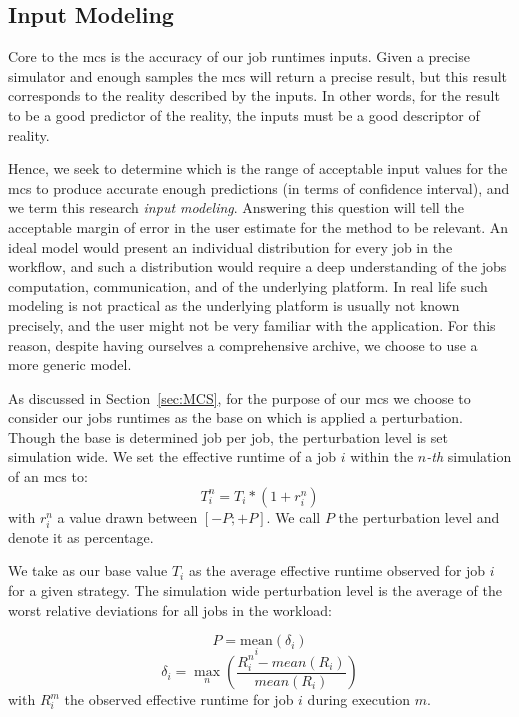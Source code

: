 \documentclass[10pt,conference,compsocconf]{IEEEtran}
\begin{document}
\subsection{Input Modeling}\label{sec:im}

Core  to the  \acl{mcs} is  the accuracy  of our  job runtimes  inputs. Given  a
precise simulator and enough samples the  \ac{mcs} will return a precise result,
but this  result corresponds to  the reality described  by the inputs.  In other
words, for the result to be a good  predictor of the reality, the inputs must be
a good descriptor of reality.

Hence, we seek  to determine which is  the range of acceptable  input values for
the  \ac{mcs} to  produce accurate  enough predictions  (in terms  of confidence
interval),  and we  term this  research \emph{input  modeling}.  Answering  this
question will tell the  acceptable margin of error in the  user estimate for the
method to be relevant.
An ideal  model would present  an individual distribution  for every job  in the
workflow, and such a distribution would require a deep understanding of the jobs
computation, communication, and  of the underlying platform.  In  real life such
modeling  is not  practical  as the  underlying platform  is  usually not  known
precisely, and  the user might  not be very  familiar with the  application. For
this reason, despite having ourselves a  comprehensive archive, we choose to use
a more generic model.

As discussed in Section~\ref{sec:MCS}, for the purpose of our \ac{mcs} we choose
to  consider   our  jobs   runtimes  as   the  base  on   which  is   applied  a
perturbation. Though the base is determined  job per job, the perturbation level
is  set  simulation  wide.  We set the  effective  runtime of  a  job  $i$
within  the $n$\textit{-th} simulation of an \ac{mcs} to:
\[T_i^n = T_i * (1+r_i^n)\]
with $r_i^n$ a value drawn between $[-P;+P]$. We call $P$ the perturbation level
and denote it as percentage. 

We take as  our base value $T_i$  as the average effective  runtime observed for
job $i$ for a given strategy.  The simulation wide  perturbation level is  the
average of  the worst relative deviations for all jobs in the workload:

\[P = \underset{i}{\textrm{mean}}(\delta{}_i)\]
\[\delta{}_i = \max_n\left(\frac{R_i^n-mean(R_i)}{mean(R_i)}\right)\]
with $R_i^m$ the observed effective runtime for job $i$ during execution $m$. 
\end{document}
